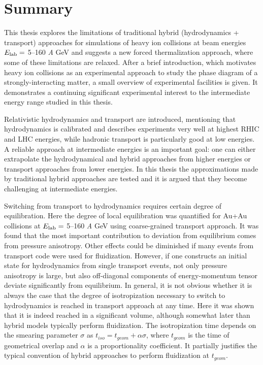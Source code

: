 \chapter{Summary}
\label{chap:summary}

This thesis explores the limitations of traditional hybrid (hydrodynamics +
transport) approaches for simulations of heavy ion collisions at beam energies
$E_\mathrm{lab} = $ 5--160 \emph{A} GeV and suggests a new forced thermalization
approach, where some of these limitations are relaxed. After a brief
introduction, which motivates heavy ion collisions as an experimental approach
to study the phase diagram of a strongly-interacting matter, a small overview
of experimental facilities is given. It demonstrates a continuing significant
experimental interest to the intermediate energy range studied in this thesis.

Relativistic hydrodynamics and transport are introduced, mentioning that
hydrodynamics is calibrated and describes experiments very well at highest RHIC
and LHC energies, while hadronic transport is particularly good at low
energies. A reliable approach at intermediate energies is an important goal:
one can either extrapolate the hydrodynamical and hybrid approaches from higher
energies or transport approaches from lower energies. In this thesis
the approximations made by traditional hybrid approaches are tested and it is argued
that they become challenging at intermediate energies.

Switching from transport to hydrodynamics requires certain degree of equilibration.
Here the degree of local equilibration was quantified for Au+Au collisions at $E_\mathrm{lab} =
$ 5--160 \emph{A} GeV using coarse-grained transport approach. It was found that the
most important contribution to deviation from equilibrium comes from pressure
anisotropy. Other effects could be diminished if many events from transport code were
used for fluidization. However, if one constructs an initial state for hydrodynamics
from single transport events, not only pressure anisotropy is large, but also
off-diagonal components of energy-momentum tensor deviate significantly from
equilibrium. In general, it is not obvious whether it is always the case that
the degree of isotropization necessary
to switch to hydrodynamics is reached in transport approach at any time. Here it was
shown that it is indeed reached in a significant volume, although somewhat later than
hybrid models typically perform fluidization. The isotropization time depends on the
smearing parameter $\sigma$ as $t_{iso} = t_{geom} + \alpha \sigma$, where $t_{geom}$ is
the time of geometrical overlap and $\alpha$ is a proportionality coefficient. It
partially justifies the typical convention of hybrid approaches to perform fluidization
at $t_{geom}$.

